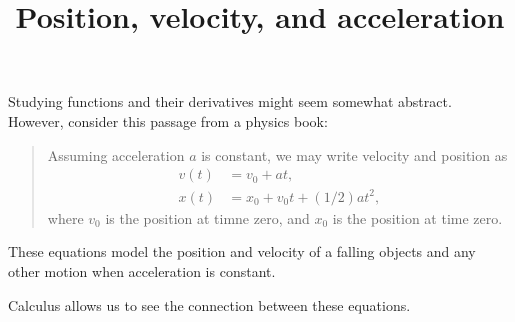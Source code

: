 \documentclass{ximera}
\title[Dig-In:]{Position, velocity, and acceleration}
\begin{document}
\begin{abstract}
\end{abstract}
\maketitle

Studying functions and their derivatives might seem somewhat
abstract. However, consider this passage from a physics book:
\begin{quote}
  Assuming acceleration $a$ is constant, we may write velocity and
  position as
  \begin{align*}
    v(t) &= v_0 + at,\\
    x(t) &= x_0 + v_0 t + (1/2) a t^2,
  \end{align*}
  where $v_0$ is the position at timne zero, and $x_0$ is the position
  at time zero.
\end{quote}
These equations model the position and velocity of a falling objects
and any other motion when acceleration is constant.




Calculus allows us to see the connection between these equations. 
\end{document}
